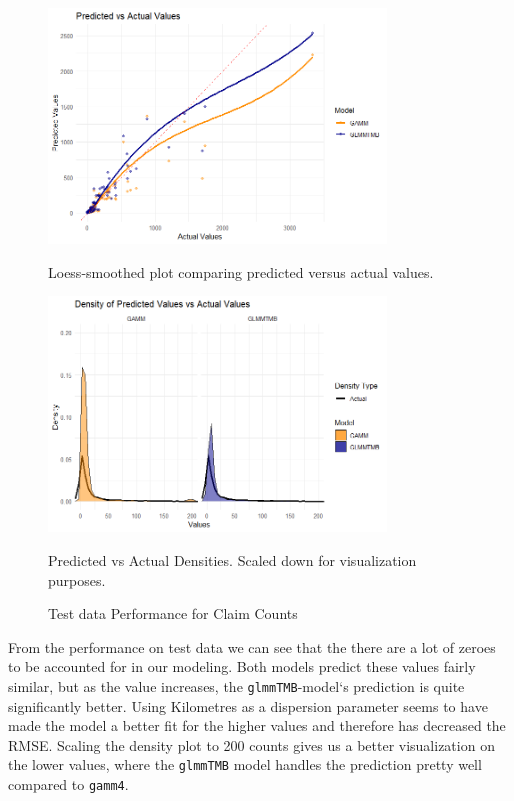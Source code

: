 \documentclass[12pt, twoside,hidelinks]{article}
\theoremstyle{definition}
\numberwithin{equation}{section}
\begin{document}
\begin{figure}[H]
\centering

\includegraphics[width=0.8\textwidth]{visuals/InsuranceData/ClaimCountpredvact.png}
\caption*{Loess-smoothed plot comparing predicted versus actual values.}
\label{fig:hist_pred_errors}

\includegraphics[width=0.8\textwidth]{visuals/InsuranceData/ClaimCountpredvactdens.png}
\caption*{Predicted vs Actual Densities. Scaled down for visualization purposes.}
\label{fig:predicted_vs_actual_densities}

\caption{Test data Performance for Claim Counts}
\label{fig:test_data_performance_4}
\end{figure}


From the performance on test data we can see that the there are a lot of zeroes to be accounted for in our modeling. Both models predict these values fairly similar, but as the value increases, the \texttt{glmmTMB}-model`s prediction is quite significantly better. Using Kilometres as a dispersion parameter seems to have made the model a better fit for the higher values and therefore has decreased the RMSE. Scaling the density plot to 200 counts gives us a better visualization on the lower values, where the \texttt{glmmTMB} model handles the prediction pretty well compared to \texttt{gamm4}.
\end{document}
